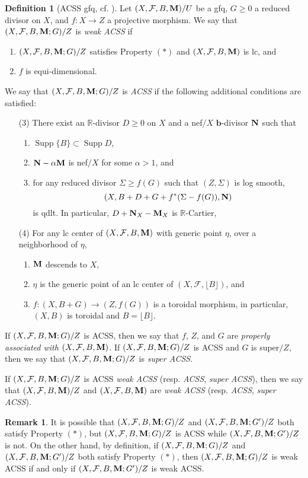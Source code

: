 \documentclass[11pt]{amsart}
\numberwithin{equation}{section}
\newcommand{\bb}{\bm{b}}
\newcommand{\Mm}{{\bf{M}}}
\newcommand{\Nn}{{\bf{N}}}
\newcommand{\Rr}{\mathbb{R}}
\newcommand{\Supp}{\operatorname{Supp}}
\newcommand{\Ff}{\mathcal{F}}
\theoremstyle{definition}
\newtheorem{defn}[thm]{Definition}
\theoremstyle{definition}
\newtheorem{rem}[thm]{Remark}
\theoremstyle{definition}
\begin{document}
\begin{defn}[ACSS gfq, {cf. \cite[Definition 4.3]{DLM23}}]\label{defn: ACSS f-triple}
Let $(X,\Ff,B,\Mm)/U$ be a gfq, $G\geq 0$ a reduced divisor on $X$, and $f: X\rightarrow Z$ a projective morphism. We say that $(X,\Ff,B,\Mm;G)/Z$ is \emph{weak ACSS} if 
\begin{enumerate}
    \item $(X,\Ff,B,\Mm;G)/Z$ satisfies Property $(*)$ and $(X,\Ff,B,\Mm)$ is lc, and
    \item $f$ is equi-dimensional.
\end{enumerate}
We say that $(X,\Ff,B,\Mm;G)/Z$ is \emph{ACSS} if the following additional conditions are satisfied:
\begin{enumerate}
  \item[(3)]  There exist an $\Rr$-divisor $D\geq 0$ on $X$ and a nef$/X$ $\bb$-divisor $\Nn$ such that
    \begin{enumerate}
      \item  $\Supp\{B\}\subset\Supp D$,
      \item $\Nn-\alpha \Mm$ is nef$/X$ for some $\alpha>1$, and
      \item for any reduced divisor $\Sigma\geq f(G)$ such that $(Z,\Sigma)$ is log smooth, $$(X,B+D+G+f^*(\Sigma-f(G)),\Nn)$$ 
      is qdlt. In particular, $D+\Nn_X-\Mm_X$ is $\Rr$-Cartier, 
    \end{enumerate}
  \item[(4)] For any lc center of $(X,\Ff,B,\Mm)$ with generic point $\eta$, over a neighborhood of $\eta,$
    \begin{enumerate}
      \item $\Mm$ descends to $X$,
      \item $\eta$ is the generic point of an lc center of $(X,\Ff,\lfloor B\rfloor)$, and
       \item $f: (X,B+G)\rightarrow (Z,f(G))$ is a toroidal morphism, in particular, $(X,B)$ is toroidal and $B=\lfloor B\rfloor$.
    \end{enumerate}
\end{enumerate}

If $(X,\Ff,B,\Mm;G)/Z$ is ACSS, then we say that $f$, $Z$, and $G$ are \emph{properly associated with} $(X,\Ff,B,\Mm)$. If $(X,\Ff,B,\Mm;G)/Z$ is ACSS and $G$ is super$/Z$, then we say that $(X,\Ff,B,\Mm;G)/Z$ is \emph{super ACSS}.

If $(X,\Ff,B,\Mm;G)/Z$ is ACSS \emph{weak ACSS} (resp. \emph{ACSS}, \emph{super ACSS}), then we say that $(X,\Ff,B,\Mm)/Z$ and $(X,\Ff,B,\Mm)$ are \emph{weak ACSS} (resp. \emph{ACSS}, \emph{super ACSS}).
\end{defn}
\begin{rem}
It is possible that $(X,\Ff,B,\Mm;G)/Z$ and $(X,\Ff,B,\Mm;G')/Z$ both satisfy Property $(*)$, but $(X,\Ff,B,\Mm;G)/Z$ is ACSS while $(X,\Ff,B,\Mm;G')/Z$ is not. On the other hand, by definition, if $(X,\Ff,B,\Mm;G)/Z$ and $(X,\Ff,B,\Mm;G')/Z$ both satisfy Property $(*)$, then $(X,\Ff,B,\Mm;G)/Z$ is weak ACSS if and only if $(X,\Ff,B,\Mm;G')/Z$ is weak ACSS.
\end{rem}
\end{document}
